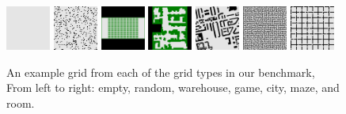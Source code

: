 \documentclass{ecai}
\begin{document}
\begin{figure}
    \centering
    \includegraphics[width=0.13\textwidth]{Images/empty-16-16.pdf}\enspace
    \includegraphics[width=0.13\textwidth]{Images/random-64-64-10.pdf}\enspace
    \includegraphics[width=0.13\textwidth]{Images/warehouse-10-20-10-2-2.pdf}\enspace
    \includegraphics[width=0.13\textwidth]{Images/game-den312d.pdf}\enspace
    \includegraphics[width=0.13\textwidth]{Images/city-Berlin_1_256.pdf}\enspace
    \includegraphics[width=0.13\textwidth]{Images/maze-128-128-2.pdf}\enspace
    \includegraphics[width=0.13\textwidth]{Images/room-64-64-8.pdf}    
    \caption{An example grid from each of the grid types in our benchmark, From left to right: empty, random, warehouse, game, city, maze, and room.}
    \label{fig:grid-types}
\end{figure}
\end{document}

